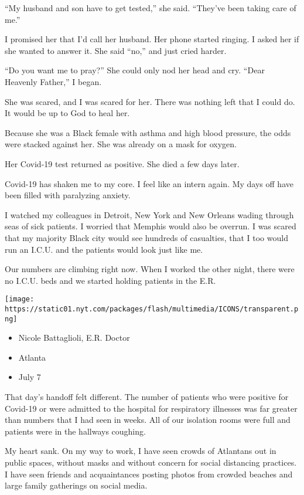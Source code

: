 ``My husband and son have to get tested,'' she said. ``They've been
taking care of me.''

I promised her that I'd call her husband. Her phone started ringing. I
asked her if she wanted to answer it. She said ``no,'' and just cried
harder.

``Do you want me to pray?'' She could only nod her head and cry. ``Dear
Heavenly Father,'' I began.

She was scared, and I was scared for her. There was nothing left that I
could do. It would be up to God to heal her.

Because she was a Black female with asthma and high blood pressure, the
odds were stacked against her. She was already on a mask for oxygen.

Her Covid-19 test returned as positive. She died a few days later.

Covid-19 has shaken me to my core. I feel like an intern again. My days
off have been filled with paralyzing anxiety.

I watched my colleagues in Detroit, New York and New Orleans wading
through seas of sick patients. I worried that Memphis would also be
overrun. I was scared that my majority Black city would see hundreds of
casualties, that I too would run an I.C.U. and the patients would look
just like me.

Our numbers are climbing right now. When I worked the other night, there
were no I.C.U. beds and we started holding patients in the E.R.

\texttt{[image: https://static01.nyt.com/packages/flash/multimedia/ICONS/transparent.png]}

\begin{itemize}
\tightlist
\item
  Nicole Battaglioli, E.R. Doctor
\item
  Atlanta
\item
  July 7
\end{itemize}

That day's handoff felt different. The number of patients who were
positive for Covid-19 or were admitted to the hospital for respiratory
illnesses was far greater than numbers that I had seen in weeks. All of
our isolation rooms were full and patients were in the hallways
coughing.

My heart sank. On my way to work, I have seen crowds of Atlantans out in
public spaces, without masks and without concern for social distancing
practices. I have seen friends and acquaintances posting photos from
crowded beaches and large family gatherings on social media.

